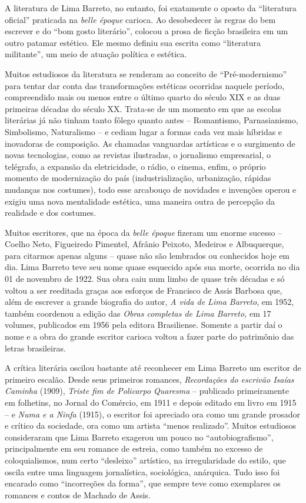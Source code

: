 A literatura de Lima Barreto, no entanto, foi exatamente o oposto da
``literatura oficial'' praticada na \emph{belle époque} carioca. Ao
desobedecer às regras do bem escrever e do ``bom gosto literário'',
colocou a prosa de ficção brasileira em um outro patamar estético. Ele
mesmo definiu sua escrita como ``literatura militante'', um meio de
atuação política e estética.

Muitos estudiosos da literatura se renderam ao conceito de
``Pré-modernismo'' para tentar dar conta das transformações estéticas
ocorridas naquele período, compreendido mais ou menos entre o último
quarto do século XIX e as duas primeiras décadas do século XX. Trata-se
de um momento em que as escolas literárias já não tinham tanto fôlego
quanto antes -- Romantismo, Parnasianismo, Simbolismo, Naturalismo -- e
cediam lugar a formas cada vez mais híbridas e inovadoras de composição.
As chamadas vanguardas artísticas e o surgimento de novas tecnologias,
como as revistas ilustradas, o jornalismo empresarial, o telégrafo, a
expansão da eletricidade, o rádio, o cinema, enfim, o próprio momento de
modernização do país (industrialização, urbanização, rápidas mudanças
nos costumes), todo esse arcabouço de novidades e invenções operou e
exigiu uma nova mentalidade estética, uma maneira outra de percepção da
realidade e dos costumes.

Muitos escritores, que na época da \emph{belle époque} fizeram um enorme
sucesso -- Coelho Neto, Figueiredo Pimentel, Afrânio Peixoto, Medeiros e
Albuquerque, para citarmos apenas alguns -- quase não são lembrados ou
conhecidos hoje em dia. Lima Barreto teve seu nome quase esquecido após
sua morte, ocorrida no dia 01 de novembro de 1922. Sua obra caiu num
limbo de quase três décadas e só voltou a ser reeditada graças aos
esforços de Francisco de Assis Barbosa que, além de escrever a grande
biografia do autor, \emph{A vida de Lima Barreto}, em 1952, também
coordenou a edição das \emph{Obras completas de Lima Barreto,} em 17
volumes, publicados em 1956 pela editora Brasiliense. Somente a partir
daí o nome e a obra do grande escritor carioca voltou a fazer parte do
patrimônio das letras brasileiras.

A crítica literária oscilou bastante até reconhecer em Lima Barreto um
escritor de primeiro escalão. Desde seus primeiros romances,
\emph{Recordações do escrivão Isaías Caminha} (1909), \emph{Triste fim
de Policarpo Quaresma} -- publicado primeiramente em folhetins, no
Jornal do Comércio, em 1911 e depois editado em livro em 1915 -- e
\emph{Numa e a Ninfa} (1915), o escritor foi apreciado ora como um
grande prosador e crítico da sociedade, ora como um artista ``menos
realizado''. Muitos estudiosos consideraram que Lima Barreto exagerou um
pouco no ``autobiografismo'', principalmente em seu romance de estreia,
como também no excesso de coloquialismos, num certo ``desleixo''
artístico, na irregularidade do estilo, que oscila entre uma linguagem
jornalística, sociológica, anárquica. Tudo isso foi encarado como
``incorreções da forma'', que sempre teve como exemplares os romances e
contos de Machado de Assis.

